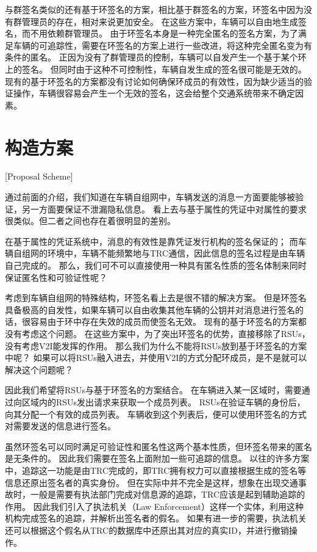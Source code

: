 与群签名类似的还有基于环签名的方案\cite{xiong2010efficient,chaurasia2011conditional,zeng2015privacy}，相比基于群签名的方案，环签名中因为没有群管理员的存在，相对来说更加安全。
在这些方案中，车辆可以自由地生成签名，而不用依赖群管理员。
由于环签名本身是一种完全匿名的签名方案，为了满足车辆的可追踪性，需要在环签名的方案上进行一些改进，将这种完全匿名变为有条件的匿名\cite{张建明2012车辆自组网的位置隐私保护技术研究}。
正因为没有了群管理员的控制，车辆可以自发产生一个基于某个环上的签名。
但同时由于这种不可控制性，车辆自发生成的签名很可能是无效的。
现有的基于环签名的方案都没有讨论如何确保环成员的有效性，因为缺少适当的验证操作，车辆很容易会产生一个无效的签名，这会给整个交通系统带来不确定因素。

\section{构造方案}[Proposal Scheme]

通过前面的介绍，我们知道在车辆自组网中，车辆发送的消息一方面要能够被验证，另一方面要保证不泄漏隐私信息。
看上去与基于属性的凭证中对属性的要求很类似。但二者之间也存在着很明显的差别。

在基于属性的凭证系统中，消息的有效性是靠凭证发行机构的签名保证的；
而车辆自组网的环境中，车辆不能频繁地与TRC通信，因此信息的签名过程是由车辆自己完成的。
那么，我们可不可以直接使用一种具有匿名性质的签名体制来同时保证匿名性和可验证性呢？

考虑到车辆自组网的特殊结构，环签名看上去是很不错的解决方案。
但是环签名具备极高的自发性，如果车辆可以自由收集其他车辆的公钥并对消息进行签名的话，很容易由于环中存在失效的成员而使签名无效。
现有的基于环签名的方案\cite{xiong2010efficient,chaurasia2011conditional,zeng2015privacy}都没有考虑这个问题。
在这些方案中，为了突出环签名的优势，直接移除了RSUs，没有考虑V2I能发挥的作用。
那么我们为什么不能将RSUs放到基于环签名的方案中呢？
如果可以将RSUs融入进去，并使用V2I的方式分配环成员，是不是就可以解决这个问题呢？

因此我们希望将RSUs与基于环签名的方案结合。
在车辆进入某一区域时，需要通过向区域内的RSUs发出请求来获取一个成员列表。
RSUs在验证车辆的身份后，向其分配一个有效的成员列表。
车辆收到这个列表后，便可以使用环签名的方式对需要发送的信息进行签名。

虽然环签名可以同时满足可验证性和匿名性这两个基本性质，但环签名带来的匿名是无条件的。
因此我们需要在签名上面附加一些可追踪的信息。
以往的许多方案中，追踪这一功能是由TRC完成的，即TRC拥有权力可以直接根据生成的签名等信息还原出签名者的真实身份。
但在实际中并不完全是这样，想象在出现交通事故时，一般是需要有执法部门完成对信息源的追踪，TRC应该是起到辅助追踪的作用。
因此我们引入了执法机关（Law Enforcement）这样一个实体，利用这种机构完成签名的追踪，并解析出签名者的假名。
如果有进一步的需要，执法机关还可以根据这个假名从TRC的数据库中还原出其对应的真实ID，并进行撤销操作。

